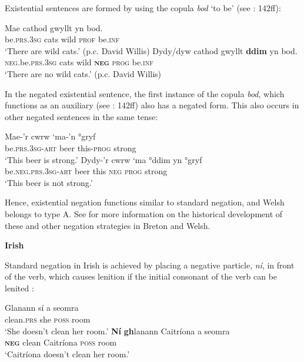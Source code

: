 \documentclass[output=paper]{langsci/langscibook}
\begin{document}
\begin{unindented}
Existential sentences are formed by using the copula \textit{bod} `to be' (see \citealt{King2003}: 142ff):
%
\begin{exe}\ex \gll Mae cathod  gwyllt  yn  bod.  \\
be.\textsc{prs.3sg}  cats  wild  \textsc{prof}  be.\textsc{inf} \\
    \glt `There are wild cats.' (p.c. David Willis)
\ex \gll Dydy/dyw cathod  gwyllt  \textbf{ddim}  yn   bod.  \\
\textsc{neg}.be.\textsc{prs.3sg}  cats  wild  \textbf{\textsc{neg}}  \textsc{prog}  be.\textsc{inf} \\
    \glt `There are no wild cats.' (p.c. David Willis)
    \end{exe}

In the negated existential sentence, the first instance of the copula \textit{bod}, which functions as an auxiliary (see \citealt{King2003}: 142ff) also has a negated form. This also occurs in other negated sentences in the same tense:
%
\begin{exe}\ex \gll Mae-’r cwrw `ma-'n     °gryf \\
be.\textsc{prs.3sg-art} beer    this-\textsc{prog} strong \\
    \glt `This beer is strong.' \citep[146]{King2003}
\ex \gll Dydy-’r cwrw ‘ma °ddim yn   °gryf \\
be.\textsc{neg.prs.3sg-art} beer this \textsc{neg} \textsc{prog} strong \\
    \glt `This beer is not strong.' \citep[146]{King2003}
    \end{exe}

Hence, existential negation functions similar to standard negation, and Welsh belongs to type A. See \citet{Willis2013} for more information on the historical development of these and other negation strategies in Breton and Welsh. 

\textbf{Irish}

Standard negation in Irish is achieved by placing a negative particle, \textit{ní}, in front of the verb, which causes lenition if the initial consonant of the verb can be lenited \citep[86]{Stenson2008}:
%
\begin{exe}\ex \gll Glanann  sí a seomra \\
clean.\textsc{prs} she \textsc{poss} room \\
    \glt `She doesn't clean her room.' \citet[86]{Stenson2008}
\ex \gll \textbf{Ní} \textbf{gh}lanann Caitríona a seomra \\
\textbf{\textsc{neg}} clean Caitríona \textsc{poss} room \\
    \glt `Caitríona doesn't clean her room.' \citet[86]{Stenson2008}
    \end{exe}


\end{unindented}
\end{document}
